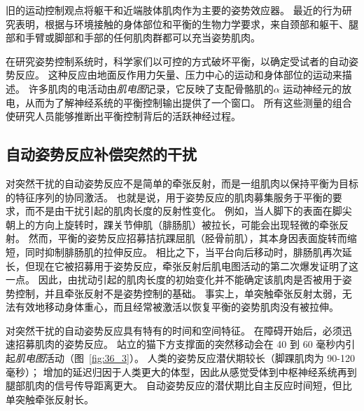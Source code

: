 旧的运动控制观点将躯干和近端肢体肌肉作为主要的姿势效应器。
最近的行为研究表明，根据与环境接触的身体部位和平衡的生物力学要求，来自颈部和躯干、腿部和手臂或脚部和手部的任何肌肉群都可以充当姿势肌肉。


在研究姿势控制系统时，科学家们以可控的方式破坏平衡，以确定受试者的自动姿势反应。
这种反应由地面反作用力矢量、压力中心的运动和身体部位的运动来描述。
许多肌肉的电活动由\textit{肌电图}记录，它反映了支配骨骼肌的$ \alpha $ 运动神经元的放电，从而为了解神经系统的平衡控制输出提供了一个窗口。
所有这些测量的组合使研究人员能够推断出平衡控制背后的活跃神经过程。



\subsection{自动姿势反应补偿突然的干扰}

对突然干扰的自动姿势反应不是简单的牵张反射，而是一组肌肉以保持平衡为目标的特征序列的协同激活。
也就是说，用于姿势反应的肌肉募集服务于平衡的要求，而不是由干扰引起的肌肉长度的反射性变化。
例如，当人脚下的表面在脚尖朝上的方向上旋转时，踝关节伸肌（腓肠肌）被拉长，可能会出现轻微的牵张反射。
然而，平衡的姿势反应招募拮抗踝屈肌（胫骨前肌），其本身因表面旋转而缩短，同时抑制腓肠肌的拉伸反应。
相比之下，当平台向后移动时，腓肠肌再次延长，但现在它被招募用于姿势反应，牵张反射后肌电图活动的第二次爆发证明了这一点。
因此，由扰动引起的肌肉长度的初始变化并不能确定该肌肉是否被用于姿势控制，并且牵张反射不是姿势控制的基础。
事实上，单突触牵张反射太弱，无法有效地移动身体重心，而且经常被激活以恢复平衡的姿势肌肉没有被拉伸。


对突然干扰的自动姿势反应具有特有的时间和空间特征。 在障碍开始后，必须迅速招募肌肉的姿势反应。
站立的猫下方支撑面的突然移动会在 40 到 60 毫秒内引起\textit{肌电图}活动（图~\ref{fig:36_3}）。
人类的姿势反应潜伏期较长（脚踝肌肉为 90-120 毫秒）；
增加的延迟归因于人类更大的体型，因此从感觉受体到中枢神经系统再到腿部肌肉的信号传导距离更大。
自动姿势反应的潜伏期比自主反应时间短，但比单突触牵张反射长。


